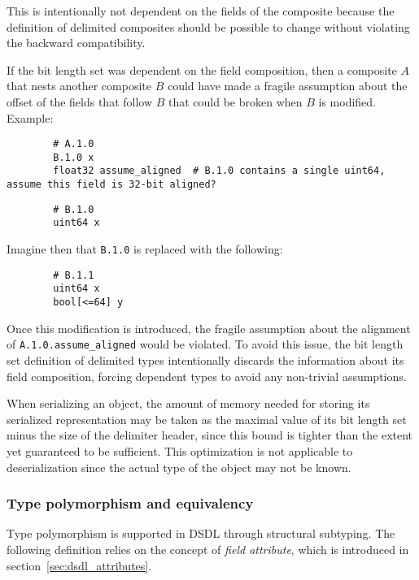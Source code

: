 \begin{remark}
    This is intentionally not dependent on the fields of the composite because the definition of delimited
    composites should be possible to change without violating the backward compatibility.

    If the bit length set was dependent on the field composition, then a composite $A$ that nests another composite
    $B$ could have made a fragile assumption about the offset of the fields that follow $B$
    that could be broken when $B$ is modified. Example:

    \begin{verbatim}
        # A.1.0
        B.1.0 x
        float32 assume_aligned  # B.1.0 contains a single uint64, assume this field is 32-bit aligned?
    \end{verbatim}

    \begin{verbatim}
        # B.1.0
        uint64 x
    \end{verbatim}

    Imagine then that \verb|B.1.0| is replaced with the following:

    \begin{verbatim}
        # B.1.1
        uint64 x
        bool[<=64] y
    \end{verbatim}

    Once this modification is introduced, the fragile assumption about the alignment of
    \verb|A.1.0.assume_aligned| would be violated.
    To avoid this issue, the bit length set definition of delimited types intentionally discards the information
    about its field composition, forcing dependent types to avoid any non-trivial assumptions.
\end{remark}

When serializing an object, the amount of memory needed for storing its serialized representation
may be taken as the maximal value of its bit length set minus the size of the delimiter header,
since this bound is tighter than the extent yet guaranteed to be sufficient.
This optimization is not applicable to deserialization since the actual type of the object may not be known.

\subsubsection{Type polymorphism and equivalency}

Type polymorphism is supported in DSDL through structural subtyping.
The following definition relies on the concept of \emph{field attribute},
which is introduced in section~\ref{sec:dsdl_attributes}.

